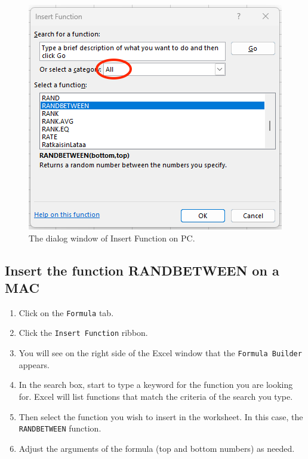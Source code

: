 \documentclass[
]{book}
\providecommand{\tightlist}{%
  \setlength{\itemsep}{0pt}\setlength{\parskip}{0pt}}
\begin{document}
\begin{figure}

{\centering \includegraphics[width=0.6\linewidth]{randbetween-pc} 

}

\caption{The dialog window of Insert Function on PC.}\label{fig:irandbetween-pc}
\end{figure}

\hypertarget{insert-the-function-randbetween-on-a-mac}{%
\subsection{Insert the function RANDBETWEEN on a MAC}\label{insert-the-function-randbetween-on-a-mac}}

\begin{enumerate}
\def\labelenumi{\arabic{enumi}.}
\tightlist
\item
  Click on the \texttt{Formula} tab.
\item
  Click the \texttt{Insert\ Function} ribbon.
\item
  You will see on the right side of the Excel window that the \texttt{Formula\ Builder} appears.
\item
  In the search box, start to type a keyword for the function you are looking for. Excel will list functions that match the criteria of the search you type.
\item
  Then select the function you wish to insert in the worksheet. In this case, the \texttt{RANDBETWEEN} function.
\item
  Adjust the arguments of the formula (top and bottom numbers) as needed.
\end{enumerate}
\end{document}
